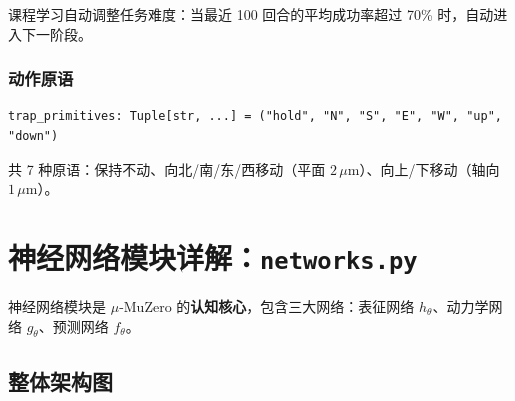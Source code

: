 \documentclass[UTF8, a4paper]{ctexart}
\begin{document}
课程学习自动调整任务难度：当最近 100 回合的平均成功率超过 70\% 时，自动进入下一阶段。

\subsubsection{动作原语}

\begin{lstlisting}
trap_primitives: Tuple[str, ...] = ("hold", "N", "S", "E", "W", "up", "down")
\end{lstlisting}

共 7 种原语：保持不动、向北/南/东/西移动（平面 $2\,\mu$m）、向上/下移动（轴向 $1\,\mu$m）。

\newpage
\section{神经网络模块详解：\texttt{networks.py}}

神经网络模块是 $\mu$-MuZero 的\textbf{认知核心}，包含三大网络：表征网络 $h_\theta$、动力学网络 $g_\theta$、预测网络 $f_\theta$。

\subsection{整体架构图}
\end{document}
